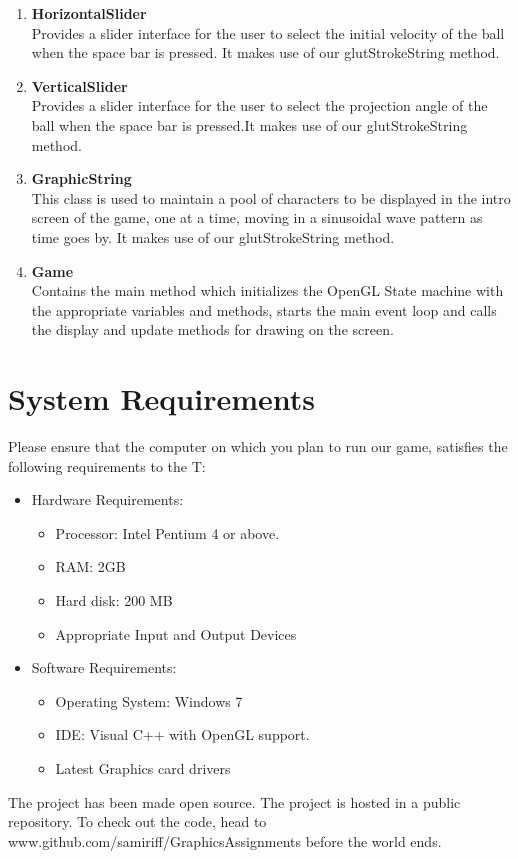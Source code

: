 \documentclass[12pt]{article} %
\begin{document}
\begin{enumerate}
\item{\textbf{HorizontalSlider}}\\
Provides a slider interface for the user to select the initial velocity of the ball when the space bar is pressed. It makes use of our glutStrokeString method.

\item{\textbf{VerticalSlider}}\\
Provides a slider interface for the user to select the projection angle of the ball when the space bar is pressed.It makes use of our glutStrokeString method.

\item{\textbf{GraphicString}}\\
This class is used to maintain a pool of characters to be displayed in the intro screen of the game, one at a time, moving in a sinusoidal wave pattern as time goes by. It makes use of our glutStrokeString method.

\item{\textbf{Game}}\\
Contains the main method which initializes the OpenGL State machine with the appropriate variables and methods, starts the main event loop and calls the display and update methods for drawing on the screen.

\end{enumerate}
\section{System Requirements}
Please ensure that the computer on which you plan to run our game, satisfies the following requirements to the T:

\begin{itemize}
\item{Hardware Requirements}:
\begin{itemize}
\item{Processor}: Intel Pentium 4 or above.
\item{RAM}: 2GB
\item{Hard disk}: 200 MB
\item{Appropriate Input and Output Devices}
\end{itemize}
\end{itemize}

\begin{itemize}
\item{Software Requirements}:
\begin{itemize}
\item{Operating System}: Windows 7
\item{IDE}: Visual C++ with OpenGL support.
\item{Latest Graphics card drivers}
\end{itemize}
\end{itemize}
The project has been made open source. The project is hosted in a public repository. To check out the code, head to www.github.com/samiriff/GraphicsAssignments before the world ends.
\end{document}
